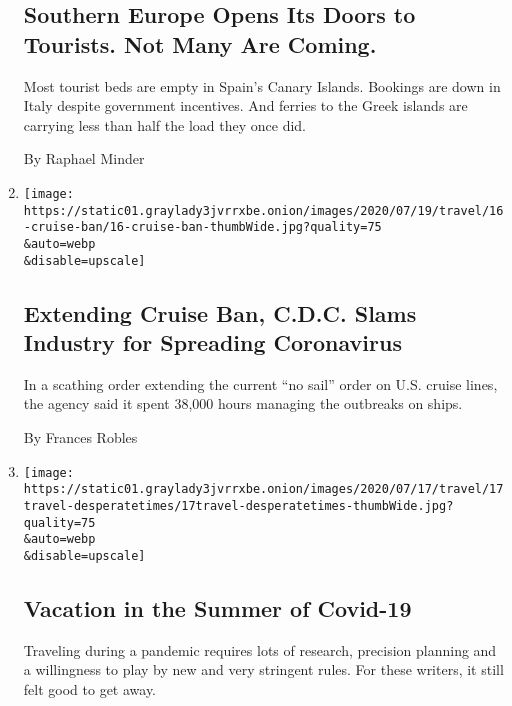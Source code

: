 \begin{enumerate}
  \hypertarget{southern-europe-opens-its-doors-to-tourists-not-many-are-coming}{%
  \subsection{Southern Europe Opens Its Doors to Tourists. Not Many Are
  Coming.}\label{southern-europe-opens-its-doors-to-tourists-not-many-are-coming}}

  Most tourist beds are empty in Spain's Canary Islands. Bookings are
  down in Italy despite government incentives. And ferries to the Greek
  islands are carrying less than half the load they once did.

  By Raphael Minder
\item
  \href{/2020/07/16/travel/coronavirus-cruise-ban-extended.html}{}

  \texttt{[image: https://static01.graylady3jvrrxbe.onion/images/2020/07/19/travel/16-cruise-ban/16-cruise-ban-thumbWide.jpg?quality=75\\\&auto=webp\\\&disable=upscale]}

  \hypertarget{extending-cruise-ban-cdc-slams-industry-for-spreading-coronavirus}{%
  \subsection{Extending Cruise Ban, C.D.C. Slams Industry for Spreading
  Coronavirus}\label{extending-cruise-ban-cdc-slams-industry-for-spreading-coronavirus}}

  In a scathing order extending the current ``no sail'' order on U.S.
  cruise lines, the agency said it spent 38,000 hours managing the
  outbreaks on ships.

  By Frances Robles
\item
  \href{/2020/07/16/travel/virus-vacation.html}{}

  \texttt{[image: https://static01.graylady3jvrrxbe.onion/images/2020/07/17/travel/17travel-desperatetimes/17travel-desperatetimes-thumbWide.jpg?quality=75\\\&auto=webp\\\&disable=upscale]}

  \hypertarget{vacation-in-the-summer-of-covid-19}{%
  \subsection{Vacation in the Summer of
  Covid-19}\label{vacation-in-the-summer-of-covid-19}}

  Traveling during a pandemic requires lots of research, precision
  planning and a willingness to play by new and very stringent rules.
  For these writers, it still felt good to get away.


\end{enumerate}
